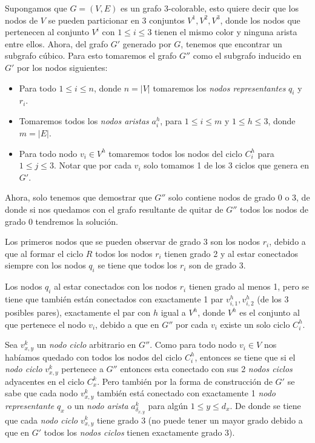 \documentclass{article}
\begin{document}
Supongamos que $G = (V,E)$ es un grafo 3-colorable, esto quiere decir que los nodos de $V$ se pueden
particionar en 3 conjuntos $V^1,V^2,V^3$, donde los nodos que pertenecen al conjunto $V^i$ con $1\leq i\leq 3$
tienen el mismo color y ninguna arista entre ellos. Ahora, del grafo $G'$ generado por $G$, tenemos que encontrar un subgrafo cúbico.
Para esto tomaremos el grafo $G''$ como el subgrafo inducido en $G'$ por los nodos siguientes:
\begin{itemize}
    \item Para todo $1\leq i\leq n$, donde $n=|V|$ tomaremos los \textit{nodos representantes} $q_i$ y $r_i$.
    \item Tomaremos todos los \textit{nodos aristas} $a_i^h$, para $1\leq i\leq m$ y $1\leq h\leq 3$, donde $m=|E|$.
    \item Para todo nodo $v_i\in V^h$ tomaremos todos los nodos del ciclo $C_i^h$ para $1\leq j\leq 3$. Notar que por cada $v_i$ solo tomamos 1 de los 3 ciclos que genera en $G'$.
\end{itemize}

Ahora, solo tenemos que demostrar que $G''$ solo contiene nodos de grado 0 o 3, de donde si nos quedamos con el grafo resultante de
quitar de $G''$ todos los nodos de grado 0 tendremos la solución.

Los primeros nodos que se pueden observar de grado 3 son los nodos $r_i$, debido a que al formar el ciclo $R$ todos los nodos $r_i$ tienen grado 2 y al
estar conectados siempre con los nodos $q_i$ se tiene que todos los $r_i$ son de grado 3.

Los nodos $q_i$ al estar conectados con los nodos $r_i$ tienen grado al menos 1, pero se tiene que también están conectados con exactamente 1 par $v_{i,1}^h, v_{i,2}^h$ (de los 3 posibles pares), exactamente el par con $h$ igual
a $V^h$, donde $V^h$ es el conjunto al que pertenece el nodo $v_i$, debido a que en $G''$ por cada $v_i$ existe un solo ciclo $C_i^h$.

Sea $v_{x,y}^k$ un \textit{nodo ciclo} arbitrario en $G''$. Como para todo nodo $v_i\in V$ nos habíamos quedado con todos los nodos del ciclo $C_i^h$, entonces se tiene que si el
\textit{nodo ciclo} $v_{x,y}^k$ pertenece a $G''$ entonces esta conectado con sus 2 \textit{nodos ciclos} adyacentes en el ciclo $C_x^k$. Pero también por la forma de construcción de $G'$
se sabe que cada nodo $v_{x,y}^k$ también está conectado con exactamente 1 \textit{nodo representante} $q_x$ o un \textit{nodo arista} $a_{\delta_{x,y}}^k$ para algún $1\leq y\leq d_x$.
De donde se tiene que cada \textit{nodo ciclo} $v_{x,y}^k$ tiene grado 3 (no puede tener un mayor grado debido a que en $G'$ todos los \textit{nodos ciclos} tienen exactamente grado 3).
\end{document}
